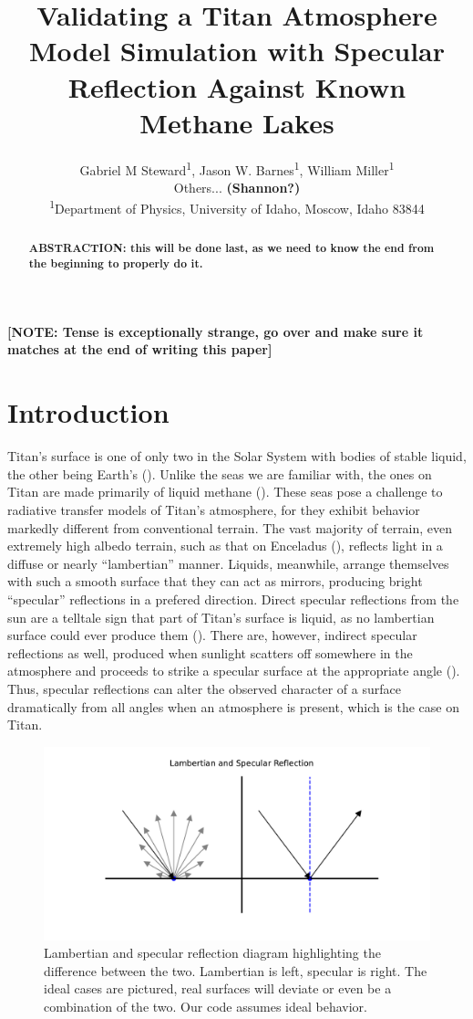 \documentclass{article}
\title{\textbf{Validating a Titan Atmosphere Model Simulation with Specular Reflection Against Known Methane Lakes}}
\author{Gabriel M Steward\textsuperscript{1}, Jason W. Barnes\textsuperscript{1}, William Miller\textsuperscript{1} \\Others... \textbf{\color{red}(Shannon?)\color{black}}\\
		{\scriptsize \textsuperscript{1}Department of Physics, University of Idaho, Moscow, Idaho 83844}
}
\begin{document}
\pagestyle{fancy}
\fancyhead{}
\maketitle

\begin{abstract}
\textbf{\color{red}ABSTRACTION: this will be done last, as we need to know the end from the beginning to properly do it.\color{black}}
\end{abstract}

\textbf{\color{red} [NOTE: Tense is exceptionally strange, go over and make sure it matches at the end of writing this paper] \color{black}}
 

\section{Introduction}
Titan's surface is one of only two in the Solar System with bodies of stable liquid, the other being Earth's (\cite{Hayes2016}). Unlike the seas we are familiar with, the ones on Titan are made primarily of liquid methane (\cite{Mastrogiuseppe2016}). These seas pose a challenge to radiative transfer models of Titan's atmosphere, for they exhibit behavior markedly different from conventional terrain. The vast majority of terrain, even extremely high albedo terrain, such as that on Enceladus (\cite{Li2023}), reflects light in a diffuse or nearly ``lambertian'' manner. Liquids, meanwhile, arrange themselves with such a smooth surface that they can act as mirrors, producing bright ``specular'' reflections in a prefered direction. Direct specular reflections from the sun are a telltale sign that part of Titan's surface is liquid, as no lambertian surface could ever produce them (\cite{Stephan2010}). There are, however, indirect specular reflections as well, produced when sunlight scatters off somewhere in the atmosphere and proceeds to strike a specular surface at the appropriate angle (\cite{Vixie2015}). Thus, specular reflections can alter the observed character of a surface dramatically from all angles when an atmosphere is present, which is the case on Titan.

\begin{figure}[htb]
\centering
\includegraphics[scale = 0.55]{LambertSpec.pdf}
\centering
\caption{Lambertian and specular reflection diagram highlighting the difference between the two. Lambertian is left, specular is right. The ideal cases are pictured, real surfaces will deviate or even be a combination of the two. Our code assumes ideal behavior.}
\label{fig:1}
\end{figure}
\end{document}
